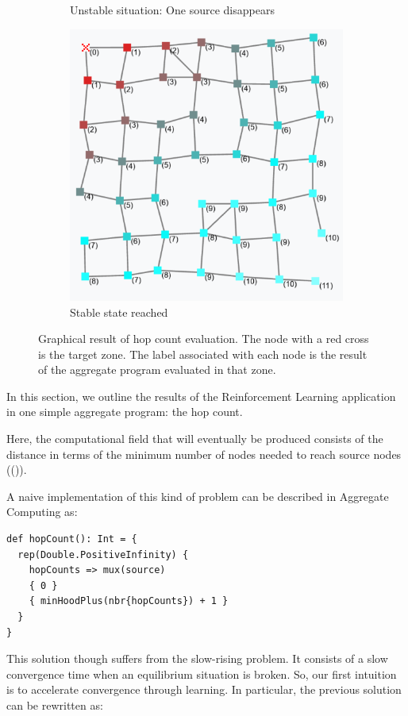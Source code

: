 \documentclass[conference]{IEEEtran}
\begin{document}
\begin{figure}[h]
\begin{subfigure}[b]{0.32\textwidth}
      \caption{Unstable situation: One source disappears}
  \end{subfigure}
  \hfill
  \begin{subfigure}[b]{0.32\textwidth}
      \centering
      \includegraphics[width=\textwidth]{img/hop-count-3.png}
      \caption{Stable state reached}
  \end{subfigure}
  \caption{Graphical result of hop count evaluation. The node with a red cross is the target zone. The label 
  associated with each node is the result of the aggregate program evaluated in that zone.}
  \label{fig:hop-count}
\end{figure}
In this section, we outline the results of the Reinforcement Learning application in one simple
 aggregate program: the hop count.

Here, the computational field that will eventually be produced consists of the distance in terms of the minimum number of nodes needed to reach source nodes (()).

A naive implementation of this kind of problem can be described in Aggregate Computing as:
\begin{verbatim}
def hopCount(): Int = {
  rep(Double.PositiveInfinity) { 
    hopCounts => mux(source) 
    { 0 } 
    { minHoodPlus(nbr{hopCounts}) + 1 }
  }
}
\end{verbatim}
This solution though suffers from the slow-rising problem. 
 It consists of a slow convergence time when an equilibrium situation is broken.
So, our first intuition is to accelerate convergence through learning.
 In particular, the previous solution can be rewritten as:
\end{document}
